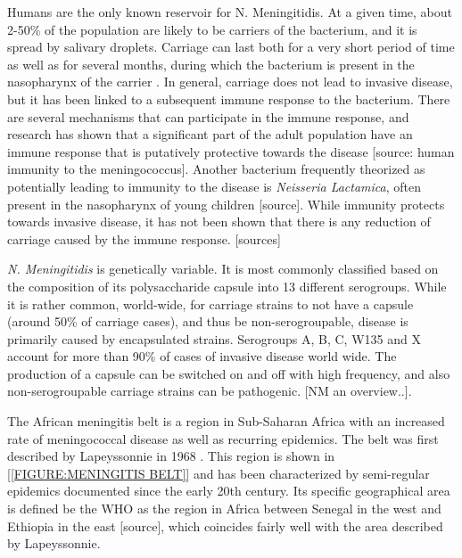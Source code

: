 \documentclass[10pt,a4paper]{article}
\begin{document}
Humans are the only known reservoir for N. Meningitidis. At a given time, about 2-50\% of the population are likely to be carriers of the bacterium, and it is spread by salivary droplets. Carriage can last both for a very short period of time as well as for several months, during which the bacterium is present in the nasopharynx of the carrier \cite{taha2002duality}. In general, carriage does not lead to invasive disease, but it has been linked to a subsequent immune response to the bacterium. There are several mechanisms that can participate in the immune response, and research has shown that a significant part of the adult population have an immune response that is putatively protective towards the disease [source: human immunity to the meningococcus]. Another bacterium frequently theorized as potentially leading to immunity to the disease is \emph{Neisseria Lactamica}, often present in the nasopharynx of young children [source]. While immunity protects towards invasive disease, it has not been shown that there is any reduction of carriage caused by the immune response. [sources]

\emph{N. Meningitidis} is genetically variable. It is most commonly classified based on the composition of its polysaccharide capsule into 13 different serogroups. While it is rather common, world-wide, for carriage strains to not have a capsule (around 50\% of carriage cases), and thus be non-serogroupable, disease is primarily caused by encapsulated strains. Serogroups A, B, C, W135 and X account for more than 90\% of cases of invasive disease world wide. The production of a capsule can be switched on and off with high frequency, and also non-serogroupable carriage strains can be pathogenic. [NM an overview..].

The African meningitis belt is a region in Sub-Saharan Africa with an increased rate of meningococcal disease as well as recurring epidemics. The belt was first described by Lapeyssonnie in 1968 \cite{lapeyssonnie}. This region is shown in \cref{[FIGURE:MENINGITIS BELT]} and has been characterized by semi-regular epidemics documented since the early 20th century. Its specific geographical area is defined be the WHO as the region in Africa between Senegal in the west and Ethiopia in the east [source], which coincides fairly well with the area described by Lapeyssonnie.
\end{document}
